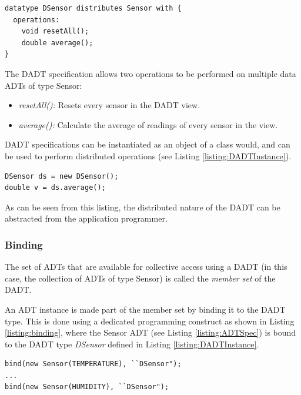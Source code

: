 \begin{lstlisting}[frame=trbl, basewidth={0.55em, 0.6em}, captionpos=b, 
basicstyle=\ttfamily\footnotesize, breaklines, caption = Data DADT 
specification (reproduced from \cite{migliavacca_DADT:2006}), label = 
listing:DADTSpec]
datatype DSensor distributes Sensor with {
  operations:
	void resetAll();
	double average();
}
\end{lstlisting}

The DADT specification allows two operations to be performed on multiple data 
ADTs of type Sensor:  
\begin{itemize}
\item \emph{resetAll():} Resets every sensor in the DADT view.
\item \emph{average():} Calculate the average of readings of every sensor in the
view.
\end{itemize}

DADT specifications can be instantiated as an object of a class would, and can
be used to perform distributed operations (see Listing \ref{listing:DADTInstance}).

\begin{lstlisting}[frame=trbl, basewidth={0.55em, 0.6em}, captionpos=b, 
basicstyle=\ttfamily\footnotesize, breaklines, caption = DADT Instantiation 
(reproduced from \cite{migliavacca_DADT:2006}), label = listing:DADTInstance ]
DSensor ds = new DSensor();
double v = ds.average();
\end{lstlisting}

As can be seen from this listing, the distributed nature of the DADT can be
abstracted from the application programmer.

\subsubsection{Binding}

The set of ADTs that are available for collective access using a DADT (in this
case, the collection of ADTs of type Sensor) is called the \emph{member set} of
the DADT.

An ADT instance is made part of the member set by binding it to the DADT type. This is done using a dedicated
programming construct as shown in Listing \ref{listing:binding}, where the
Sensor ADT (see Listing \ref{listing:ADTSpec}) is bound to the DADT type \emph{DSensor}
defined in Listing \ref{listing:DADTInstance}. 
 
 
\begin{lstlisting}[frame=trbl, basewidth={0.55em, 0.6em}, captionpos=b, 
basicstyle=\ttfamily\footnotesize, breaklines, caption = Binding ADT instances to a DADT instance, label = listing:binding ]
bind(new Sensor(TEMPERATURE), ``DSensor");
...
bind(new Sensor(HUMIDITY), ``DSensor");
\end{lstlisting} 
 

